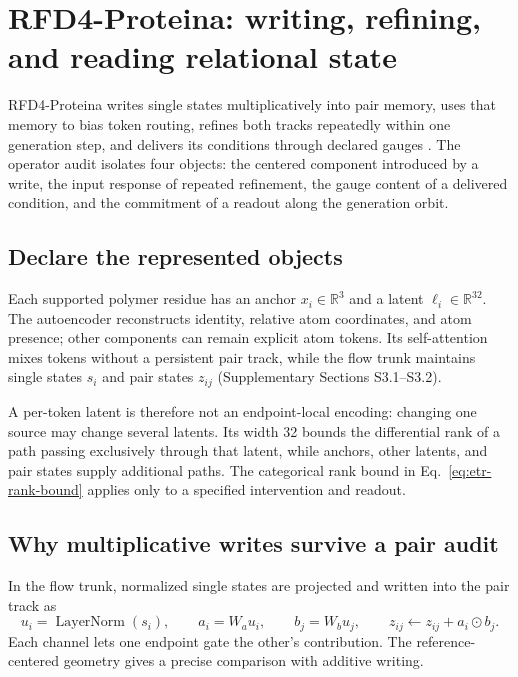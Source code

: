\section[RFD4-Proteina: relational state]{RFD4-Proteina: writing, refining, and reading relational state}
\label{sec:book-rfd4-case}

RFD4-Proteina writes single states multiplicatively into pair memory, uses that memory to bias
token routing, refines both tracks repeatedly within one generation step, and delivers its
conditions through declared gauges \cite{corley2026rfd4proteina}.  The operator audit isolates
four objects: the centered component introduced by a write, the input response of repeated
refinement, the gauge content of a delivered condition, and the commitment of a readout along the
generation orbit.

\subsection{Declare the represented objects}

Each supported polymer residue has an anchor $x_i\in\mathbb R^3$ and a latent
$\ell_i\in\mathbb R^{32}$.  The autoencoder reconstructs identity, relative atom coordinates,
and atom presence; other components can remain explicit atom tokens.  Its self-attention mixes
tokens without a persistent pair track, while the flow trunk maintains single states $s_i$ and
pair states $z_{ij}$ (Supplementary Sections S3.1--S3.2).

A per-token latent is therefore not an endpoint-local encoding: changing one source may change
several latents.  Its width 32 bounds the differential rank of a path passing exclusively through
that latent, while anchors, other latents, and pair states supply additional paths.  The
categorical rank bound in Eq.~\ref{eq:etr-rank-bound} applies only to a specified intervention
and readout.

\subsection{Why multiplicative writes survive a pair audit}

In the flow trunk, normalized single states are projected and written into the pair track as
\begin{equation}
u_i=\operatorname{LayerNorm}(s_i),\qquad
a_i=W_au_i,\qquad b_j=W_bu_j,\qquad
z_{ij}\leftarrow z_{ij}+a_i\odot b_j.
\label{eq:rfd4-hadamard-write}
\end{equation}
Each channel lets one endpoint gate the other's contribution.  The reference-centered geometry
gives a precise comparison with additive writing.

